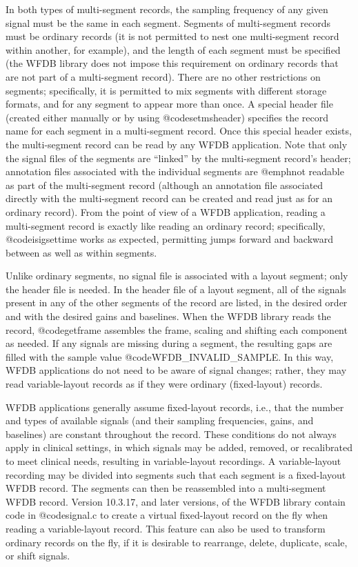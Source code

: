 {{{{{{{{{{In both types of multi-segment records, the sampling frequency of any
given signal must be the same in each segment.  Segments of
multi-segment records must be ordinary records (it is not permitted to
nest one multi-segment record within another, for example), and the
length of each segment must be specified (the WFDB library does not
impose this requirement on ordinary records that are not part of a
multi-segment record).  There are no other restrictions on segments;
specifically, it is permitted to mix segments with different storage
formats, and for any segment to appear more than once.  A special
header file (created either manually or by using @code{setmsheader})
specifies the record name for each segment in a multi-segment record.
Once this special header exists, the multi-segment record can be read
by any WFDB application.  Note that only the signal files of the
segments are ``linked'' by the multi-segment record's header;
annotation files associated with the individual segments are
@emph{not} readable as part of the multi-segment record (although an
annotation file associated directly with the multi-segment record can
be created and read just as for an ordinary record).  From the point
of view of a WFDB application, reading a multi-segment record is
exactly like reading an ordinary record; specifically,
@code{isigsettime} works as expected, permitting jumps forward and
backward between as well as within segments.

Unlike ordinary segments, no signal file is associated with a layout segment;
only the header file is needed.  In the header file of a layout segment, all of
the signals present in any of the other segments of the record are listed, in
the desired order and with the desired gains and baselines.  When the WFDB
library reads the record, @code{getframe} assembles the frame, scaling and
shifting each component as needed.  If any signals are missing during a
segment, the resulting gaps are filled with the sample value
@code{WFDB_INVALID_SAMPLE}.  In this way, WFDB applications do not need to be
aware of signal changes; rather, they may read variable-layout records as if
they were ordinary (fixed-layout) records.

WFDB applications generally assume fixed-layout records, i.e., that
the number and types of available signals (and their sampling
frequencies, gains, and baselines) are constant throughout the record.
These conditions do not always apply in clinical settings, in which
signals may be added, removed, or recalibrated to meet clinical needs,
resulting in variable-layout recordings.  A variable-layout recording
may be divided into segments such that each segment is a fixed-layout
WFDB record.  The segments can then be reassembled into a
multi-segment WFDB record.  Version 10.3.17, and later versions, of
the WFDB library contain code in @code{signal.c} to create a virtual
fixed-layout record on the fly when reading a variable-layout record.
This feature can also be used to transform ordinary records on the fly, if
it is desirable to rearrange, delete, duplicate, scale, or shift
signals.

}}}}}}}}}}
